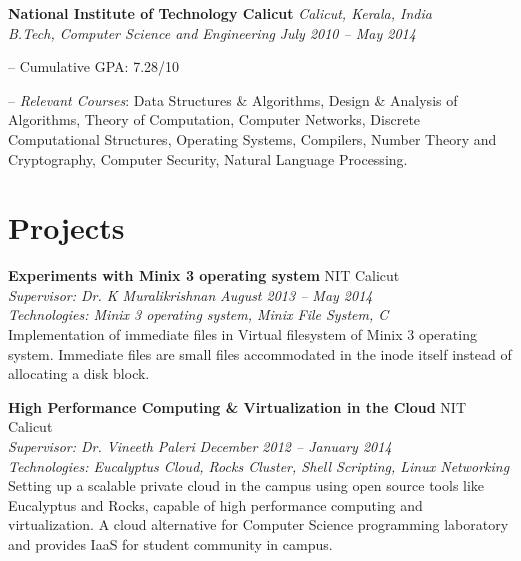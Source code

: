 \documentclass[margin,line]{resume}
\begin{document}
\begin{resume}
    \textbf{National Institute of Technology Calicut} \hfill \textit{Calicut, Kerala, India} \vspace{1mm}\\\vspace{1mm}%
    \textsl{B.Tech, Computer Science and Engineering} \hfill \textit{ July 2010 -- May 2014}\vspace{-3mm}\\\vspace{-1mm}%
    \begin{list2}
        \item[--] Cumulative GPA: 7.28/10 
        \item[--] \textit{Relevant Courses}: Data Structures \& Algorithms, Design \& Analysis of Algorithms, Theory
of Computation, Computer Networks, Discrete Computational Structures, Operating Systems, 
Compilers, Number Theory and Cryptography, Computer Security, Natural Language Processing.
    \end{list2}\vspace{-1.5mm}
    
 \vspace{3mm}


    \section{\mysidestyle Projects}

   
	
	
    \textbf{Experiments with Minix 3 operating system } 				\hfill NIT Calicut \\
      \textit{Supervisor: Dr. K Muralikrishnan } 			\hfill \textit{August 2013 -- May 2014}\\
      \textit{Technologies: Minix 3 operating system, Minix File System, C }\\
    Implementation of immediate files in Virtual filesystem of Minix 3 operating system. Immediate files are small files accommodated in the inode itself instead of allocating a disk block. 

    \textbf{High Performance Computing \& Virtualization in the Cloud} 				\hfill NIT Calicut \\
      \textit{Supervisor: Dr. Vineeth Paleri } 			\hfill \textit{December 2012 -- January 2014}\\
      \textit{Technologies: Eucalyptus Cloud, Rocks Cluster, Shell Scripting, Linux Networking}\\
    Setting up a scalable private cloud in the campus using open source tools like Eucalyptus and Rocks,
capable of high performance computing and virtualization.  A cloud alternative for Computer Science
programming laboratory and provides IaaS for student community in campus.
	\vspace{2mm}%


\end{resume}
\end{document}
